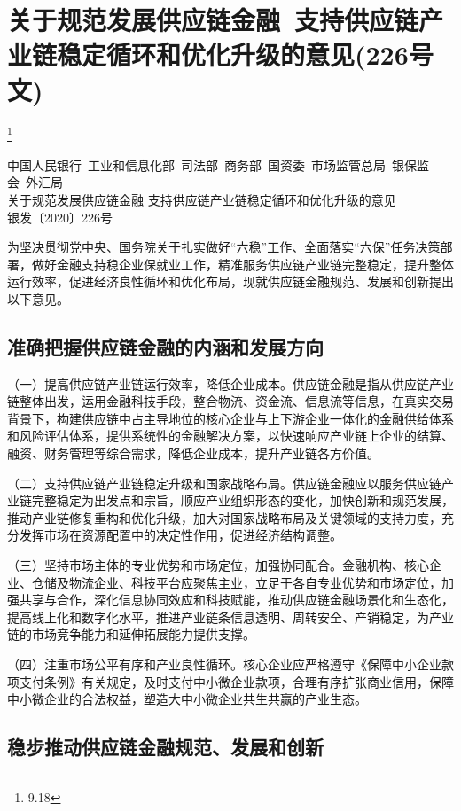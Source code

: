 \chapter{关于规范发展供应链金融~支持供应链产业链稳定循环和优化升级的意见(226号文)}\footnote{9.18} %

\begin{center}
中国人民银行~工业和信息化部~司法部~商务部~国资委~市场监管总局~银保监会~外汇局 \\
关于规范发展供应链金融 支持供应链产业链稳定循环和优化升级的意见 \\
银发〔2020〕226号
\end{center}

为坚决贯彻党中央、国务院关于扎实做好“六稳”工作、全面落实“六保”任务决策部署，做好金融支持稳企业保就业工作，精准服务供应链产业链完整稳定，提升整体运行效率，促进经济良性循环和优化布局，现就供应链金融规范、发展和创新提出以下意见。

\section{准确把握供应链金融的内涵和发展方向}

（一）提高供应链产业链运行效率，降低企业成本。供应链金融是指从供应链产业链整体出发，运用金融科技手段，整合物流、资金流、信息流等信息，在真实交易背景下，构建供应链中占主导地位的核心企业与上下游企业一体化的金融供给体系和风险评估体系，提供系统性的金融解决方案，以快速响应产业链上企业的结算、融资、财务管理等综合需求，降低企业成本，提升产业链各方价值。

（二）支持供应链产业链稳定升级和国家战略布局。供应链金融应以服务供应链产业链完整稳定为出发点和宗旨，顺应产业组织形态的变化，加快创新和规范发展，推动产业链修复重构和优化升级，加大对国家战略布局及关键领域的支持力度，充分发挥市场在资源配置中的决定性作用，促进经济结构调整。

（三）坚持市场主体的专业优势和市场定位，加强协同配合。金融机构、核心企业、仓储及物流企业、科技平台应聚焦主业，立足于各自专业优势和市场定位，加强共享与合作，深化信息协同效应和科技赋能，推动供应链金融场景化和生态化，提高线上化和数字化水平，推进产业链条信息透明、周转安全、产销稳定，为产业链的市场竞争能力和延伸拓展能力提供支撑。

（四）注重市场公平有序和产业良性循环。核心企业应严格遵守《保障中小企业款项支付条例》有关规定，及时支付中小微企业款项，合理有序扩张商业信用，保障中小微企业的合法权益，塑造大中小微企业共生共赢的产业生态。

\section{稳步推动供应链金融规范、发展和创新}

